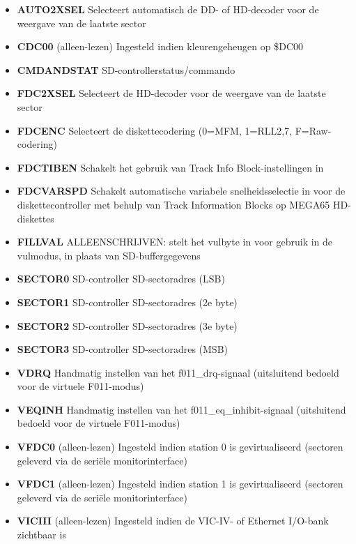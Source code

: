 \begin{itemize}
\item{\bf{AUTO2XSEL}} Selecteert automatisch de DD- of HD-decoder voor de weergave van de laatste sector
\item{\bf{CDC00}} (alleen-lezen) Ingesteld indien kleurengeheugen op \$DC00
\item{\bf{CMDANDSTAT}} SD-controllerstatus/commando
\item{\bf{FDC2XSEL}} Selecteert de HD-decoder voor de weergave van de laatste sector
\item{\bf{FDCENC}} Selecteert de diskettecodering (0=MFM, 1=RLL2,7, F=Raw-codering)
\item{\bf{FDCTIBEN}} Schakelt het gebruik van Track Info Block-instellingen in
\item{\bf{FDCVARSPD}} Schakelt automatische variabele snelheidsselectie in voor de diskettecontroller met behulp van Track Information Blocks op MEGA65 HD-diskettes
\item{\bf{FILLVAL}} ALLEENSCHRIJVEN: stelt het vulbyte in voor gebruik in de vulmodus, in plaats van SD-buffergegevens
\item{\bf{SECTOR0}} SD-controller SD-sectoradres (LSB)
\item{\bf{SECTOR1}} SD-controller SD-sectoradres (2e byte)
\item{\bf{SECTOR2}} SD-controller SD-sectoradres (3e byte)
\item{\bf{SECTOR3}} SD-controller SD-sectoradres (MSB)
\item{\bf{VDRQ}} Handmatig instellen van het f011\_drq-signaal (uitsluitend bedoeld voor de virtuele F011-modus)
\item{\bf{VEQINH}} Handmatig instellen van het f011\_eq\_inhibit-signaal (uitsluitend bedoeld voor de virtuele F011-modus)
\item{\bf{VFDC0}} (alleen-lezen) Ingesteld indien station 0 is gevirtualiseerd (sectoren geleverd via de seriële monitorinterface)
\item{\bf{VFDC1}} (alleen-lezen) Ingesteld indien station 1 is gevirtualiseerd (sectoren geleverd via de seriële monitorinterface)
\item{\bf{VICIII}} (alleen-lezen) Ingesteld indien de VIC-IV- of Ethernet I/O-bank zichtbaar is

\end{itemize}
